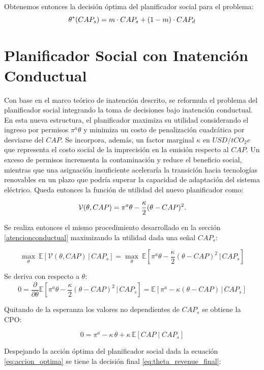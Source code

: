 Obtenemos entonces la decisión óptima del planificador social para el problema:
\begin{equation}\label{eq:theta*}
{\theta^*}(CAP_s) = m\cdot CAP_s + (1 - m)\cdot CAP_d
\end{equation}

\section{Planificador Social con Inatención Conductual}
\label{sec:planificadorIC}
Con base en el marco teórico de inatención descrito, se reformula el problema del planificador social integrando la toma de decisiones bajo inatención conductual. En esta nueva estructura, el planificador maximiza su utilidad considerando el ingreso por permisos   $\pi^a \theta$ y minimiza un costo de penalización cuadrática por desviarse del $CAP$. Se incorpora, además,  un factor marginal $\kappa$ en $USD/{tCO_2e}$ que representa el costo social de la imprecisión en la emisión respecto al $CAP$.  Un exceso de permisos incrementa la contaminación y reduce el beneficio social, mientras que una asignación insuficiente aceleraría la transición hacia tecnologías renovables en un plazo que podría superar la capacidad de adaptación del sistema eléctrico. Queda entonces la función de utilidad del nuevo planificador como:

\begin{equation}\label{eq:utilidadv}
\mathcal{V}(\theta,CAP) = \pi^a \theta - \frac{\kappa}{2}(\theta - CAP)^2.
\end{equation}

Se realiza entonces el mismo procedimiento desarrollado en la sección \ref{atencionconductual} maximizando la utilidad dada una señal $CAP_s$:

\[
\max_{\theta} \ \mathbb{E} \!\left[ \mathcal{V}(\theta,CAP)\,\big|\,CAP_s \right]
=
\max_{\theta} \ \mathbb{E}\!\left[\pi^a \theta - \frac{\kappa}{2}(\theta-CAP)^2 \,\bigg|\,CAP_s\right]
\]

Se deriva con respecto a $\theta$:
\[
0 
= \frac{\partial}{\partial \theta} 
\mathbb{E}\!\left[\pi^a \theta - \frac{\kappa}{2}(\theta-CAP)^2 \,\bigg|\,CAP_s\right]
= \mathbb{E}\!\left[\pi^a - \kappa(\theta - CAP)\,\bigg|\,CAP_s\right]
\]

Quitando de la esperanza los valores no dependientes de $CAP_s$ se obtiene la CPO:

\[
0 
= \pi^a - \kappa\,\theta + \kappa\,\mathbb{E}[CAP \mid CAP_s]
\]

Despejando la acción óptima del planificador social dada la ecuación \ref{eq:accion_optima} se tiene la decisión final \ref{eq:theta_revenue_final}:

